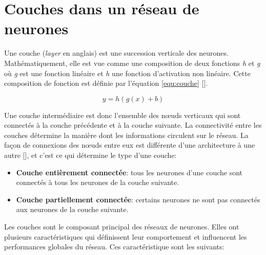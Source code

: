 \section{Couches dans un réseau de neurones}
Une couche (\textit{layer} en anglais) est une succession verticale des
neurones. Mathématiquement, elle est vue comme une composition de deux
fonctions \textit{h} et \textit{g} où \textit{g} est une fonction linéaire et
\textit{h} une fonction d’activation non linéaire. Cette composition de
fonction est définie par l'équation \ref{equ:couche}
[\cite{Goodfellow-et-al-2016}].

\begin{equation}
	y = h(g(x) + b)
	\label{equ:couche}
\end{equation}

\medskip
Une couche intermédiaire est donc l’ensemble des nœuds verticaux qui sont connectés à la couche précédente et à la couche suivante. La connectivité entre les couches détermine la manière dont les informations circulent sur le réseau. La façon de connexions des nœuds entre eux est différente d’une architecture à une autre [\cite{Goodfellow-et-al-2016}], et c’est ce qui détermine le type d'une couche:
\begin{itemize}
	\item \textbf{Couche entièrement connectée}: tous les neurones d'une couche sont connectés à tous les neurones de la couche suivante.
	\item \textbf{Couche partiellement connectée}: certains neurones ne sont pas connectés aux neurones de la couche suivante.
\end{itemize}

Les couches sont le composant principal des réseaux de neurones. Elles ont
plusieurs caractéristiques qui définissent leur comportement et influencent les
performances globales du réseau. Ces caractéristique sont les suivants:

